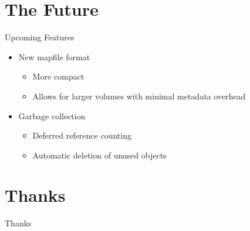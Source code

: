 \documentclass[utf8]{beamer}
\begin{document}
\section{The Future}

\begin{frame}{Upcoming Features}

  \begin{itemize}
    \item New mapfile format
      \begin{itemize}
      \item More compact
      \item Allows for larger volumes with minimal metadata overhead
      \end{itemize}
    \item Garbage collection
      \begin{itemize}
      \item Deferred reference counting
      \item Automatic deletion of unused objects
      \end{itemize}
    \end{itemize}

\end{frame}

\section{Thanks}

\begin{frame}{Thanks}


\end{frame}
\end{document}
